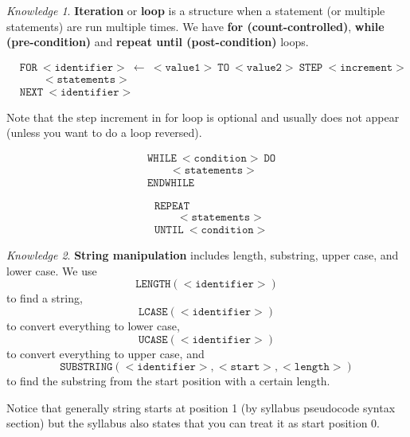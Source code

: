 \documentclass[8pt]{article}
\theoremstyle{remark}
\newtheorem{knowledge}{Knowledge}[subsection]
\begin{document}
            \begin{knowledge}
                \textbf{Iteration} or \textbf{loop} is a structure when a statement (or multiple statements) are run multiple times. We have \textbf{for (count-controlled)}, \textbf{while (pre-condition)} and \textbf{repeat until (post-condition)} loops.

                \begin{align*}
                    &\mathtt{FOR\ <identifier>\ \leftarrow\ <value1>\ TO\ <value2>\ STEP\ <increment>}\\
                    &\qquad \mathtt{<statements>}\\
                    &\mathtt{NEXT\ <identifier>}
                \end{align*}

                Note that the step increment in for loop is optional and usually does not appear (unless you want to do a loop reversed).

                \begin{align*}
                    &\mathtt{WHILE\ <condition>\ DO}\\
                    &\qquad \mathtt{<statements>}\\
                    &\mathtt{ENDWHILE}
                \end{align*}

                \begin{align*}
                    &\mathtt{REPEAT}\\
                    &\qquad \mathtt{<statements>}\\
                    &\mathtt{UNTIL\ <condition>}
                \end{align*}
            \end{knowledge}

            \begin{knowledge}
                \textbf{String manipulation} includes length, substring, upper case, and lower case. We use
                \[
                    \mathtt{LENGTH(<identifier>)}
                \]
                to find a string,
                \[
                    \mathtt{LCASE(<identifier>)}
                \]
                to convert everything to lower case,
                \[
                    \mathtt{UCASE(<identifier>)}
                \]
                to convert everything to upper case, and
                \[
                    \mathtt{SUBSTRING(<identifier>, <start>, <length>)}
                \]
                to find the substring from the start position with a certain length.

                Notice that generally string starts at position 1 (by syllabus pseudocode syntax section) but the syllabus also states that you can treat it as start position 0.
            \end{knowledge}
\end{document}
